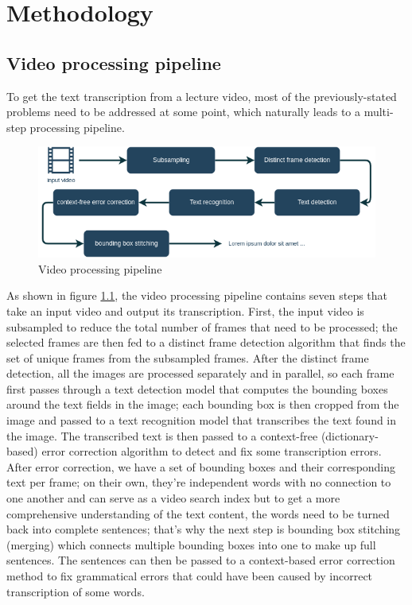 \chapter{Methodology}

\section{Video processing pipeline}

To get the text transcription from a lecture video, most of the previously-stated problems need to be addressed at some point, which naturally leads to a multi-step processing pipeline.

\begin{figure}[H]
        \centering
        \includegraphics[width=140mm]{figures/ocr_pipeline}
        \caption{Video processing pipeline}
        \label{meth:ocr_pipeline}
\end{figure}

As shown in figure \ref{meth:ocr_pipeline}, the video processing pipeline contains seven steps that take an input video and output its transcription. First, the input video is subsampled to reduce the total number of frames that need to be processed; the selected frames are then fed to a distinct frame detection algorithm that finds the set of unique frames from the subsampled frames. After the distinct frame detection, all the images are processed separately and in parallel, so each frame first passes through a text detection model that computes the bounding boxes around the text fields in the image; each bounding box is then cropped from the image and passed to a text recognition model that transcribes the text found in the image. The transcribed text is then passed to a context-free (dictionary-based) error correction algorithm to detect and fix some transcription errors. After error correction, we have a set of bounding boxes and their corresponding text per frame; on their own, they're independent words with no connection to one another and can serve as a video search index but to get a more comprehensive understanding of the text content, the words need to be turned back into complete sentences; that's why the next step is bounding box stitching (merging) which connects multiple bounding boxes into one to make up full sentences. The sentences can then be passed to a context-based error correction method to fix grammatical errors that could have been caused by incorrect transcription of some words.

